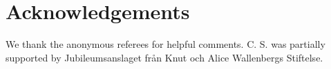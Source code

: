 \documentclass{elsarticle}
\begin{document}
\section*{Acknowledgements}
We thank the anonymous referees for helpful comments.
C. S. was
partially supported by Jubileumsanslaget fr\r{a}n Knut och
Alice Wallenbergs Stiftelse.





%
\end{document}
